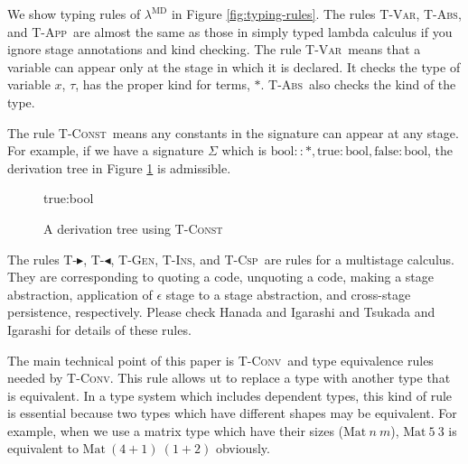 \documentclass[runningheads]{llncs}
\newcommand{\LMD}{$\lambda^{\textrm{MD}}$\xspace}
\newcommand{\G}{\Gamma}
\newcommand{\V}{\vdash_\Sigma}
\newcommand{\TB}{\blacktriangleright}
\newcommand{\TBL}{\blacktriangleleft}
\newcommand{\TConst}{\textsc{T-Const}}
\newcommand{\TVar}{\textsc{T-Var}}
\newcommand{\TAbs}{\textsc{T-Abs}}
\newcommand{\TApp}{\textsc{T-App}}
\newcommand{\TConv}{\textsc{T-Conv}}
\newcommand{\TTB}{\textsc{T-$\TB$}}
\newcommand{\TTBL}{\textsc{T-$\TBL$}}
\newcommand{\TGen}{\textsc{T-Gen}}
\newcommand{\TIns}{\textsc{T-Ins}}
\newcommand{\TCsp}{\textsc{T-Csp}}
\newcommand{\ID}[1]{\infer[]{#1}{\vdots}}
\begin{document}

We show typing rules of \LMD in Figure \ref{fig:typing-rules}.
The rules \TVar , \TAbs, and \TApp\ are almost the same as those in simply typed lambda calculus 
if you ignore stage annotations and kind checking.
The rule \TVar\ means that a variable can appear only at the stage in which it is declared.
It checks the type of variable $x$, $\tau$, has the proper kind for terms, $*$.
\TAbs\ also checks the kind of the type.

The rule \TConst\ means any constants in the signature can appear at any stage.
For example, if we have a signature $\Sigma$ which is $\textrm{bool} :: *, \textrm{true}: \textrm{bool}, \textrm{false}: \textrm{bool}$,
the derivation tree in Figure \ref{fig:tconst-derivation-tree} is admissible.

\begin{figure}
	\begin{center}
		\begin{minipage}{0.50\hsize}
			\infer[\TConst]
			{\G \V \textrm{true}:\textrm{bool}@\alpha\beta}
			{\textrm{true}:\textrm{bool} \in \Sigma \andalso
				\ID{\G\V\textrm{bool}::*@\alpha\beta} \andalso
			}
			\caption{A derivation tree using \TConst}
			\label{fig:tconst-derivation-tree}
		\end{minipage}
	\end{center}
\end{figure}

The rules \TTB, \TTBL, \TGen, \TIns, and \TCsp\ are rules for a multistage calculus.
They are corresponding to quoting a code, unquoting a code, making a stage abstraction, 
application of $\epsilon$ stage to a stage abstraction, and cross-stage persistence, respectively.
Please check Hanada and Igarashi \cite{Hanada2014} and Tsukada and Igarashi \cite{Tsukada} for details of these rules.

The main technical point of this paper is \TConv\ and type equivalence rules needed by \TConv.
This rule allows ut to replace a type with another type that is equivalent.
In a type system which includes dependent types, this kind of rule is essential
because two types which have different shapes may be equivalent.
For example, when we use a matrix type which have their sizes ($\textrm{Mat}\ n\ m$),
$\textrm{Mat}\ 5\ 3$ is equivalent to $\textrm{Mat}\ (4+1)\ (1+2)$ obviously.
\end{document}
